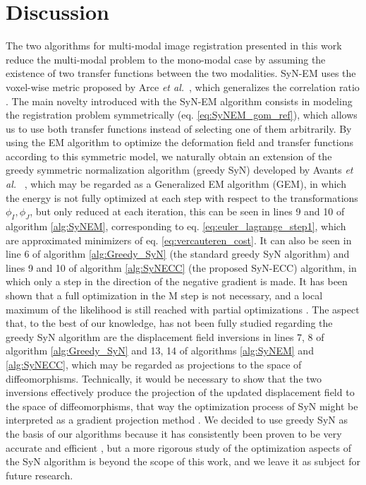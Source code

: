 \section{Discussion}
    The two algorithms for multi-modal image registration presented in this work reduce the multi-modal problem to the mono-modal case by assuming the existence of two transfer functions between the two modalities. SyN-EM uses the voxel-wise metric proposed by Arce {\it et al.}~\cite{Arce-santana2014}, which generalizes the correlation ratio \cite{Roche1998}. The main novelty introduced with the SyN-EM algorithm consists in modeling the registration problem symmetrically (eq. \eqref{eq:SyNEM_gom_ref}), which allows us to use both transfer functions instead of selecting one of them arbitrarily. By using the EM algorithm to optimize the deformation field and transfer functions according to this symmetric model, we naturally obtain an extension of the greedy symmetric normalization algorithm (greedy SyN) developed by Avants {\it et al.}~\cite{Avants2008} \cite{Avants2011}, which may be regarded as a Generalized EM algorithm (GEM), in which the energy is not fully optimized at each step with respect to the transformations $\phi_{I}, \phi_{J}$, but only reduced at each iteration, this can be seen in lines 9 and 10 of algorithm \ref{alg:SyNEM}, corresponding to eq. \eqref{eq:euler_lagrange_step1}, which are approximated minimizers of eq. \eqref{eq:vercauteren_cost}. It can also be seen in line 6 of algorithm \ref{alg:Greedy_SyN} (the standard greedy SyN algorithm) and lines 9 and 10 of algorithm \ref{alg:SyNECC} (the proposed SyN-ECC) algorithm, in which only a step in the direction of the negative gradient is made. It has been shown that a full optimization in the M step is not necessary, and a local maximum of the likelihood is still reached with partial optimizations \cite{Neal1998}. The aspect that, to the best of our knowledge, has not been fully studied regarding the greedy SyN algorithm are the displacement field inversions in lines 7, 8 of algorithm \ref{alg:Greedy_SyN} and 13, 14 of algorithms \ref{alg:SyNEM} and \ref{alg:SyNECC}, which may be regarded as projections to the space of diffeomorphisms. Technically, it would be necessary to show that the two inversions effectively produce the projection of the updated displacement field to the space of diffeomorphisms, that way the optimization process of SyN might be interpreted as a gradient projection method \cite{Xiu2007}. We decided to use greedy SyN as the basis of our algorithms because it has consistently been proven to be very accurate and efficient \cite{Klein2009} \cite{Klein2010} \cite{Rohlfing2012}, but a more rigorous study of the optimization aspects of the SyN algorithm is beyond the scope of this work, and we leave it as subject for future research.\\
    
